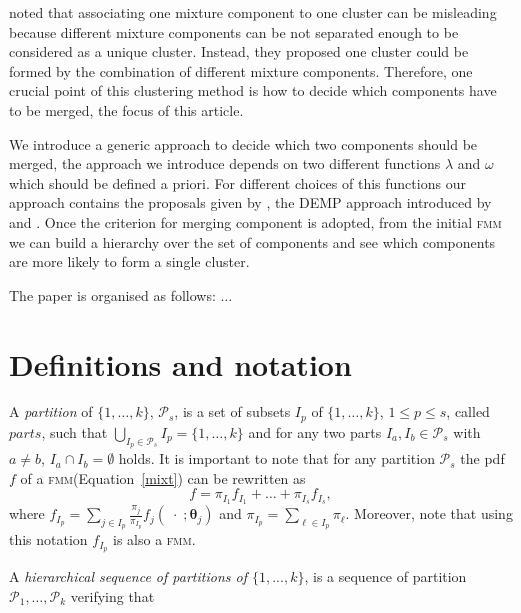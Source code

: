 \documentclass[10pt, a4paper]{article}
\newcommand{\m}[1]{\boldsymbol{#1}}
\newcommand{\fmm}{\textsc{fmm}\xspace}
\begin{document}
\begin{spacing}{1.9}
\cite{lee2004combining,hennig2010methods,baudry2010combining,melnykov2013distribution,pastore2013merging} noted that associating one mixture component to one cluster can be misleading because different mixture components can be not separated enough to be considered as a unique cluster. Instead, they proposed one cluster could be formed by the combination of different mixture components. Therefore, one crucial point of this clustering method is how to decide which components have to be merged, the focus of this article.


We introduce a generic approach to decide which two components should be merged, the approach we introduce depends on two different functions $\lambda$ and $\omega$ which should be defined a priori. For different choices of this functions our approach contains the proposals given by \cite{baudry2010combining}, the DEMP approach introduced by \cite{hennig2010methods} and \cite{longford2014}. Once the criterion for merging component is adopted, from the initial \fmm we can build a hierarchy over the set of components and see which components are more likely to form a single cluster.

The paper is organised as follows: $\dots$


\section{Definitions and notation}

%
A \emph{partition} of $\{1, \dots, k\}$, $\mathcal{P}_s$,  is a set of subsets $I_p$ of $\{1, \dots, k\}$, $1\leq p \leq s$, called $parts$, such that $\bigcup_{I_p \in \mathcal{P}_s} I_p = \{1, \dots, k\}$ and for any two parts $I_a, I_b \in \mathcal{P}_s$ with $a \neq b$, $I_a \cap I_b = \emptyset$ holds. It is important to note that for any partition  $\mathcal{P}_s$ the pdf $f$ of a \fmm (Equation~\ref{mixt}) can be rewritten as
\begin{equation}
f = \pi_{I_1} f_{I_1} + \dots + \pi_{I_s} f_{I_s},
\label{mixt_part}
\end{equation}
where $f_{I_p} = \sum_{j \in I_p} \frac{\pi_j}{\pi_{I_p}} f_j(\;\cdot\; ; \m\theta_j)$ and $\pi_{I_p} = \sum_{\ell \in I_p} \pi_\ell$. Moreover, note that using this notation $f_{I_p}$ is also a \fmm.



A \emph{hierarchical sequence of partitions of $\{1,...,k\}$}, is a sequence of partition $\mathcal{P}_1, \dots, \mathcal{P}_k$ verifying that
  

\end{spacing}
\end{document}
